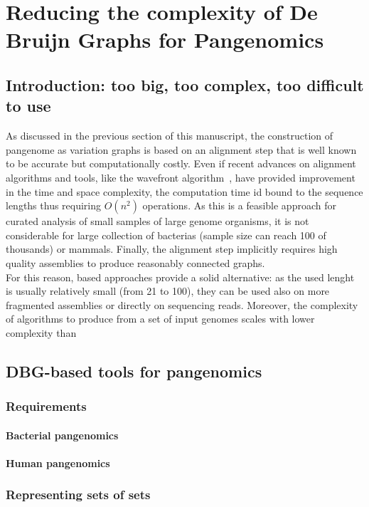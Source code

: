 \chapter{Reducing the complexity of De Bruijn Graphs for Pangenomics}
\label{sec:complexity}

\section{Introduction: too big, too complex, too difficult to use}
As discussed in the previous section of this manuscript, the  construction of pangenome as variation graphs is based on an alignment step that is well known to be accurate but computationally costly. Even if recent advances on alignment algorithms and tools, like the wavefront algorithm~\cite{wavefront}, have provided improvement in the time and space complexity, the computation time id bound to the sequence lengths thus requiring $O(n^2)$ operations. As this is a feasible approach for curated analysis of small samples of large genome organisms, it is not considerable for large collection of bacterias (sample size can reach 100 of thousands) or mammals. Finally, the alignment step implicitly requires high quality assemblies to produce reasonably connected graphs.\\
For this reason, \kmer based approaches provide a solid alternative: as the used \kmer lenght is usually relatively small (from 21 to 100), they can be used also on more fragmented assemblies or directly on sequencing reads. Moreover, the complexity of algorithms to produce \ccdbg from a set of input genomes scales with lower complexity than  

\section{DBG-based tools for pangenomics}

\subsection{Requirements}
\subsubsection{Bacterial pangenomics}
\subsubsection{Human pangenomics}

\subsection{Representing sets of \kmer sets}

